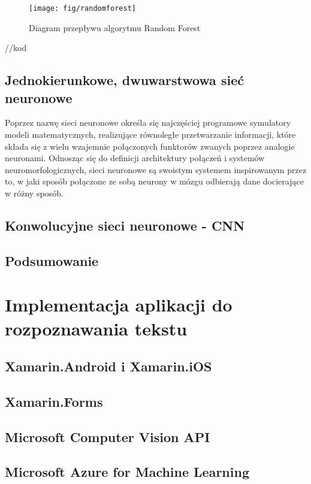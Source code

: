 \documentclass[brudnopis]{xmgr}
\begin{document}
\begin{figure}[!tbh]
\centering
\texttt{[image: fig/randomforest]}
\caption{Diagram przepływu algorytmu Random Forest}
\end{figure}
\newpage

//kod

\section{Jednokierunkowe, dwuwarstwowa sieć neuronowe}

Poprzez nazwę sieci neuronowe określa się najczęściej programowe symulatory modeli matematycznych, realizujące równoległe przetwarzanie informacji, które składa się z wielu wzajemnie połączonych funktorów zwanych poprzez analogie neuronami. Odnosząc się do definicji architektury połączeń i systemów neuromorfologicznych, sieci neuronowe są swoistym systemem inspirowanym przez to, w jaki sposób połączone ze sobą neurony w mózgu odbierają dane docierające w różny sposób.

\section{Konwolucyjne sieci neuronowe - CNN}

\section{Podsumowanie}

\chapter{Implementacja aplikacji do rozpoznawania tekstu}

\section{Xamarin.Android i Xamarin.iOS}

\section{Xamarin.Forms}

\section{Microsoft Computer Vision API}

\section{Microsoft Azure for Machine Learning}
\end{document}
